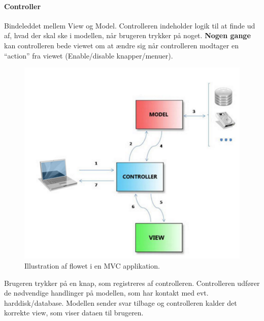 \paragraph{Controller} Bindeleddet mellem View og Model. Controlleren indeholder logik til at finde ud af, hvad der skal ske i modellen, når brugeren trykker på noget. \textbf{Nogen gange} kan controlleren bede viewet om at ændre sig når controlleren modtager en “action” fra viewet (Enable/disable knapper/menuer).\\	

\begin{figure}[h]
	\centering
	\includegraphics[width=0.7\linewidth]{figs/mvcFlow}
	\caption[Illustration af flowet i en MVC applikation]{Illustration af flowet i en MVC applikation.}
	\label{fig:mvcFlow}
\end{figure}


Brugeren trykker på en knap, som registreres af controlleren. Controlleren udfører de nødvendige handlinger på modellen, som har kontakt med evt. harddisk/database. Modellen sender svar tilbage og controlleren kalder det korrekte view, som viser dataen til brugeren.

